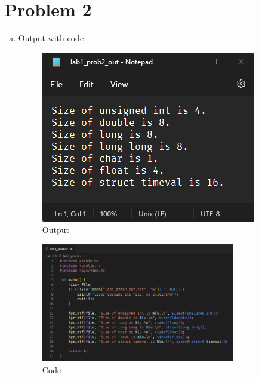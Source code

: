 \section*{Problem 2}
\begin{enumerate}[a)]
    \item Output with code\\
    \begin{figure}[h!]
        \centering
        \includegraphics{Images/2a Output.png}
        \caption{Output}
    \end{figure}
    
    \begin{figure}[h!]
        \centering
        \includegraphics[width=0.8\textwidth]{Images/2a Code.png}
        \caption{Code}
    \end{figure}
    
\end{enumerate}
